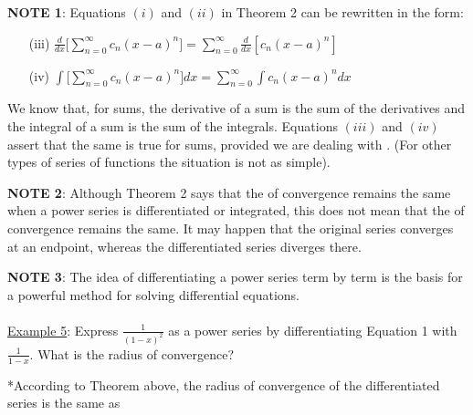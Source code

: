 \documentclass[paper=a4, fontsize=11pt]{scrartcl} %
\numberwithin{equation}{section} %
\numberwithin{figure}{section} %
\numberwithin{table}{section} %
\newcommand{\ds}{\displaystyle}
\begin{document}
  \textbf{NOTE 1}: Equations $(i)$ and $(ii)$ in Theorem 2 can be rewritten in the form:
  \begin{enumerate}
  \item[(iii)] $\ds\frac{d}{dx}\bigg[\ds\sum_{n=0}^\infty c_n (x-a)^n\bigg] = \ds\sum_{n=0}^\infty \ds\frac{d}{dx}[c_n (x-a)^n]$
  \item[(iv)] $\ds\int \bigg[\ds\sum_{n=0}^\infty c_n (x-a)^n\bigg]dx = \ds\sum_{n=0}^\infty \ds\int c_n(x-a)^n dx$
  \end{enumerate}
  \indent
  
  We know that, for \underline{\hspace{1in}} sums, the derivative of a sum is the sum of the derivatives and the integral of a sum is the sum of the integrals. Equations $(iii)$ and $(iv)$ assert that the same is true for \underline{\hspace{1in}} sums, provided we are dealing with \underline{\hspace{1in}} \underline{\hspace{1in}}. (For other types of series of functions the situation is not as simple).\\
  \indent
  
  \textbf{NOTE 2}: Although Theorem 2 says that the \underline{\hspace{1in}} of convergence remains the same when a power series is differentiated or integrated, this does not mean that the \underline{\hspace{1.25in}} of convergence remains the same. It may happen that the original series converges at an endpoint, whereas the differentiated series diverges there.\\
  \indent
  
  \textbf{NOTE 3}: The idea of differentiating a power series term by term is the basis for a powerful method for solving differential equations.\\
  \indent\\
  \indent
  \newpage
  \underline{Example 5}: Express $\ds\frac{1}{(1-x)^2}$  as a power series by differentiating Equation 1 with $\ds\frac{1}{1-x}$. What is the radius of convergence?\\
  \indent
  
  \vspace{3in}
  
  *According to Theorem above, the radius of convergence of the differentiated series is the same as\\
  \indent
  
\end{document}
